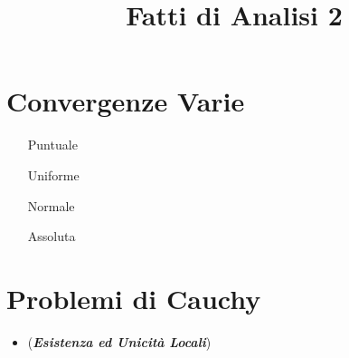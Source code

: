 \documentclass[a4paper,NoNotes]{stdmdoc}
\begin{document}
	\title{Fatti di Analisi 2}
	\author{}

	\section*{Convergenze Varie}
	\begin{itemize}
		\item[Puntuale] 
		\item[Uniforme]
		\item[Normale]
		\item[Assoluta]
	\end{itemize}

	\section*{Problemi di Cauchy}
	\begin{itemize}
		\item ({\it\bf Esistenza ed Unicità Locali})
	\end{itemize}
\end{document}

